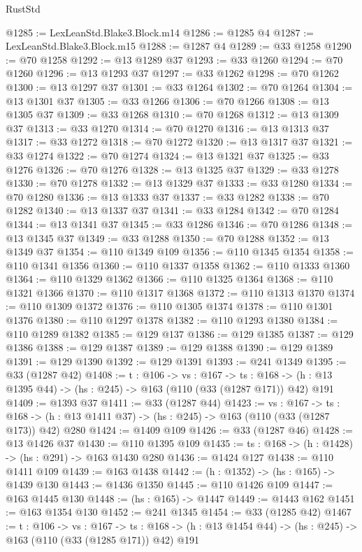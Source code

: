 \begin{lexlean}{RustStd}
\begin{coremodule}
@1285 := LexLeanStd.Blake3.Block.m14
@1286 := @1285 @4
@1287 := LexLeanStd.Blake3.Block.m15
@1288 := @1287 @4
@1289 := @33 @1258
@1290 := @70 @1258
@1292 := @13 @1289 @37
@1293 := @33 @1260
@1294 := @70 @1260
@1296 := @13 @1293 @37
@1297 := @33 @1262
@1298 := @70 @1262
@1300 := @13 @1297 @37
@1301 := @33 @1264
@1302 := @70 @1264
@1304 := @13 @1301 @37
@1305 := @33 @1266
@1306 := @70 @1266
@1308 := @13 @1305 @37
@1309 := @33 @1268
@1310 := @70 @1268
@1312 := @13 @1309 @37
@1313 := @33 @1270
@1314 := @70 @1270
@1316 := @13 @1313 @37
@1317 := @33 @1272
@1318 := @70 @1272
@1320 := @13 @1317 @37
@1321 := @33 @1274
@1322 := @70 @1274
@1324 := @13 @1321 @37
@1325 := @33 @1276
@1326 := @70 @1276
@1328 := @13 @1325 @37
@1329 := @33 @1278
@1330 := @70 @1278
@1332 := @13 @1329 @37
@1333 := @33 @1280
@1334 := @70 @1280
@1336 := @13 @1333 @37
@1337 := @33 @1282
@1338 := @70 @1282
@1340 := @13 @1337 @37
@1341 := @33 @1284
@1342 := @70 @1284
@1344 := @13 @1341 @37
@1345 := @33 @1286
@1346 := @70 @1286
@1348 := @13 @1345 @37
@1349 := @33 @1288
@1350 := @70 @1288
@1352 := @13 @1349 @37
@1354 := @110 @1349 @109
@1356 := @110 @1345 @1354
@1358 := @110 @1341 @1356
@1360 := @110 @1337 @1358
@1362 := @110 @1333 @1360
@1364 := @110 @1329 @1362
@1366 := @110 @1325 @1364
@1368 := @110 @1321 @1366
@1370 := @110 @1317 @1368
@1372 := @110 @1313 @1370
@1374 := @110 @1309 @1372
@1376 := @110 @1305 @1374
@1378 := @110 @1301 @1376
@1380 := @110 @1297 @1378
@1382 := @110 @1293 @1380
@1384 := @110 @1289 @1382
@1385 := @129 @137
@1386 := @129 @1385
@1387 := @129 @1386
@1388 := @129 @1387
@1389 := @129 @1388
@1390 := @129 @1389
@1391 := @129 @1390
@1392 := @129 @1391
@1393 := @241 @1349
@1395 := @33 (@1287 @42)
@1408 := {t : @106} ->
  {vs : @167} ->
  {ts : @168} -> (h : @13 @1395 @44) -> (hs : @245) -> @163 (@110 (@33 (@1287 @171)) @42) @191
@1409 := @1393 @37
@1411 := @33 (@1287 @44)
@1423 := {vs : @167} ->
  {ts : @168} -> (h : @13 @1411 @37) -> (hs : @245) -> @163 (@110 (@33 (@1287 @173)) @42) @280
@1424 := @1409 @109
@1426 := @33 (@1287 @46)
@1428 := @13 @1426 @37
@1430 := @110 @1395 @109
@1435 := {ts : @168} -> (h : @1428) -> (hs : @291) -> @163 @1430 @280
@1436 := @1424 @127
@1438 := @110 @1411 @109
@1439 := @163 @1438
@1442 := (h : @1352) -> (hs : @165) -> @1439 @130
@1443 := @1436 @1350
@1445 := @110 @1426 @109
@1447 := @163 @1445 @130
@1448 := (hs : @165) -> @1447
@1449 := @1443 @162
@1451 := @163 @1354 @130
@1452 := @241 @1345
@1454 := @33 (@1285 @42)
@1467 := {t : @106} ->
  {vs : @167} ->
  {ts : @168} -> (h : @13 @1454 @44) -> (hs : @245) -> @163 (@110 (@33 (@1285 @171)) @42) @191

\end{coremodule}
\end{lexlean}
